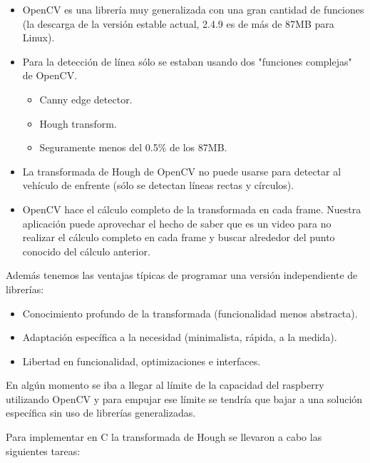\begin{itemize}
	\item OpenCV es una librería muy generalizada con una gran cantidad de funciones (la descarga de la versión estable actual, 2.4.9 es de más de 87MB para Linux).
	\item Para la detección de línea sólo se estaban usando dos "funciones complejas" de OpenCV.
	\begin{itemize}
		\item Canny edge detector.
		\item Hough transform.
		\item Seguramente menos del 0.5\% de los 87MB.
	\end{itemize}
	\item La transformada de Hough de OpenCV no puede usarse para detectar al vehículo de enfrente (sólo se detectan líneas rectas y círculos).
	\item OpenCV hace el cálculo completo de la transformada en cada frame. Nuestra aplicación puede aprovechar el hecho de saber que es un video para no realizar el cálculo completo en cada frame y buscar alrededor del punto conocido del cálculo anterior.
\end{itemize}

Además tenemos las ventajas típicas de programar una versión independiente de librerías:
\begin{itemize}
	\item Conocimiento profundo de la transformada (funcionalidad menos abstracta).
	\item Adaptación específica a la necesidad (minimalista, rápida, a la medida).
	\item Libertad en funcionalidad, optimizaciones e interfaces.
\end{itemize}

En algún momento se iba a llegar al límite de la capacidad del raspberry utilizando OpenCV y para empujar ese límite se tendría que bajar a una solución específica sin uso de librerías generalizadas.

Para implementar en C la transformada de Hough se llevaron a cabo las siguientes tareas:

